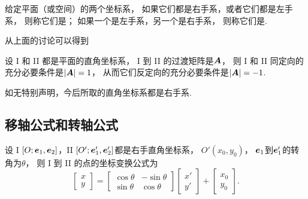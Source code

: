 \begin{definition}
给定平面（或空间）的两个坐标系，
如果它们都是右手系，或者它们都是左手系，
则称它们是；
如果一个是左手系，另一个是右手系，
则称它们是.
\end{definition}

从上面的讨论可以得到
\begin{theorem}
设 I 和 II 都是平面的直角坐标系，
I 到 II 的过渡矩阵是\(\boldsymbol{A}\)，
则 I 和 II 同定向的充分必要条件是\(\abs{\boldsymbol{A}}=1\)，
从而它们反定向的充分必要条件是\(\abs{\boldsymbol{A}}=-1\).
\end{theorem}

如无特别声明，今后所取的直角坐标系都是右手系.

\subsection{移轴公式和转轴公式}
设 I \([O;\boldsymbol{e}_1,\boldsymbol{e}_2]\)，II \([O';\boldsymbol{e}_1',\boldsymbol{e}_2']\)都是右手直角坐标系，
\(O'(x_0,y_0)\)，
\(\boldsymbol{e}_1\)到\(\boldsymbol{e}_1'\)的转角为\(\theta\)，
则 I 到 II 的点的坐标变换公式为
\begin{equation}\label{equation:解析几何.平面坐标系的点的右手直角坐标变换公式I到II.矩阵形式1}
	\begin{bmatrix}
		x \\ y
	\end{bmatrix}
	= \begin{bmatrix}
		\cos\theta & -\sin\theta \\
		\sin\theta & \cos\theta
	\end{bmatrix}
	\begin{bmatrix}
		x' \\ y'
	\end{bmatrix} + \begin{bmatrix}
		x_0 \\ y_0
	\end{bmatrix}.
\end{equation}

